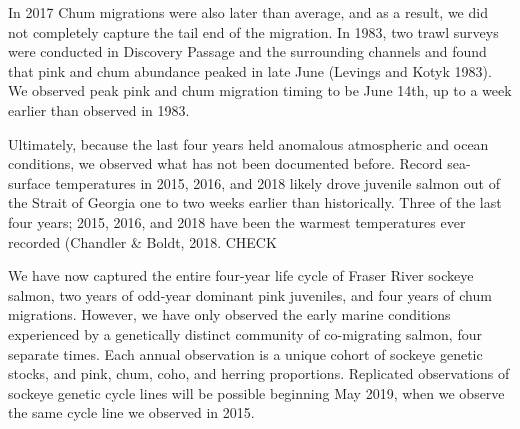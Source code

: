 \documentclass[fleqn,10pt]{wlpeerj} %
\begin{document}
In 2017 Chum migrations were also later than average, and as a result, we did not completely capture the tail end of the migration. In 1983, two trawl surveys were conducted in Discovery Passage and the surrounding channels and found that pink and chum abundance peaked in late June (Levings and Kotyk 1983). We observed peak pink and chum migration timing to be June 14th, up to a week earlier than observed in 1983.

Ultimately, because the last four years held anomalous atmospheric and ocean conditions, we observed what has not been documented before. Record sea-surface temperatures in 2015, 2016, and 2018 likely drove juvenile salmon out of the Strait of Georgia one to two weeks earlier than historically. Three of the last four years; 2015, 2016, and 2018 have been the warmest temperatures ever recorded (Chandler \& Boldt, 2018. CHECK

We have now captured the entire four-year life cycle of Fraser River sockeye salmon, two years of odd-year dominant pink juveniles, and four years of chum migrations. However, we have only observed the early marine conditions experienced by a genetically distinct community of co-migrating salmon, four separate times. Each annual observation is a unique cohort of sockeye genetic stocks, and pink, chum, coho, and herring proportions. Replicated observations of sockeye genetic cycle lines will be possible beginning May 2019, when we observe the same cycle line we observed in 2015.
\end{document}
